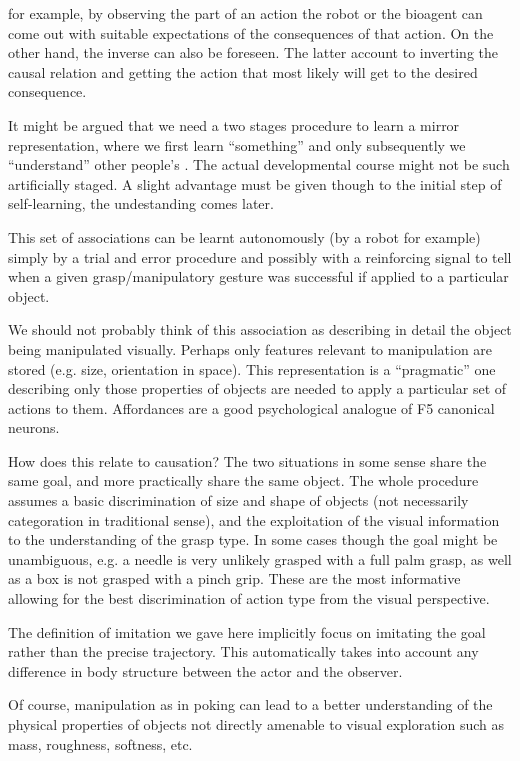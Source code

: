 \ifverbose

for example, by observing the part of an action the robot or the
bioagent can come out with suitable expectations of the consequences
of that action. On the other hand, the inverse \ahhbehavior{} can also be
foreseen. The latter account to inverting the causal relation and
getting the action that most likely will get to the desired
consequence.

It might be argued that we need a two stages procedure to learn a
mirror representation, where we first learn ``something'' and only
subsequently we ``understand'' other people's \ahhbehavior{}. The actual
developmental course might not be such artificially staged. A slight
advantage must be given though to the initial step of self-learning,
the undestanding comes later.


This set of associations can be learnt autonomously (by a robot for
example) simply by a trial and error procedure and possibly with a
reinforcing signal to tell when a given grasp/manipulatory gesture was
successful if applied to a particular object.

We should not probably think of this association as describing in
detail the object being manipulated visually. Perhaps only features
relevant to manipulation are stored (e.g. size, orientation in space).
This representation is a ``pragmatic'' one describing only those
properties of objects are needed to apply a particular set of actions
to them. Affordances are a good psychological analogue of F5
canonical neurons.
\fi


\ifverbose
How does this relate to causation?  The two situations in some sense
share the same goal, and more practically share the same object.  The
whole procedure assumes a basic discrimination of size and shape of
objects (not necessarily categor\iz{}ation in traditional sense), and the
exploitation of the visual information to the understanding of the
grasp type. In some cases though the goal might be unambiguous, e.g. a
needle is very unlikely grasped with a full palm grasp, as well as a
box is not grasped with a pinch grip. These are the most informative
allowing for the best discrimination of action type from the visual
perspective.
\fi

\ifverbose
The definition of imitation we gave here implicitly focus on imitating
the goal rather than the precise trajectory. This automatically takes
into account any difference in body structure between the actor and
the observer.

Of course, manipulation as in poking can lead to a better
understanding of the physical properties of objects not directly
amenable to visual exploration such as mass, roughness, softness, etc.
\fi

